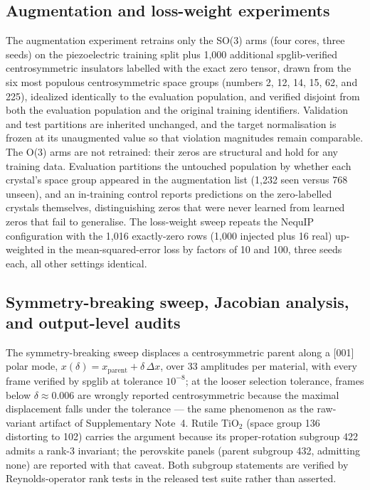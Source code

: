\subsection*{Augmentation and loss-weight experiments}

The augmentation experiment retrains only the SO(3) arms (four cores, three seeds) on the piezoelectric training split plus 1,000 additional spglib-verified centrosymmetric insulators labelled with the exact zero tensor, drawn from the six most populous centrosymmetric space groups (numbers 2, 12, 14, 15, 62, and 225), idealized identically to the evaluation population, and verified disjoint from both the evaluation population and the original training identifiers. Validation and test partitions are inherited unchanged, and the target normalisation is frozen at its unaugmented value so that violation magnitudes remain comparable. The O(3) arms are not retrained: their zeros are structural and hold for any training data. Evaluation partitions the untouched population by whether each crystal's space group appeared in the augmentation list (1,232 seen versus 768 unseen), and an in-training control reports predictions on the zero-labelled crystals themselves, distinguishing zeros that were never learned from learned zeros that fail to generalise. The loss-weight sweep repeats the NequIP configuration with the 1,016 exactly-zero rows (1,000 injected plus 16 real) up-weighted in the mean-squared-error loss by factors of 10 and 100, three seeds each, all other settings identical.

\subsection*{Symmetry-breaking sweep, Jacobian analysis, and output-level audits}

The symmetry-breaking sweep displaces a centrosymmetric parent along a [001] polar mode, $x(\delta) = x_{\mathrm{parent}} + \delta\,\Delta x$, over 33 amplitudes per material, with every frame verified by spglib at tolerance $10^{-8}$; at the looser selection tolerance, frames below $\delta\approx0.006$ are wrongly reported centrosymmetric because the maximal displacement falls under the tolerance --- the same phenomenon as the raw-variant artifact of Supplementary Note~4. Rutile TiO$_2$ (space group 136 distorting to 102) carries the argument because its proper-rotation subgroup 422 admits a rank-3 invariant; the perovskite panels (parent subgroup 432, admitting none) are reported with that caveat. Both subgroup statements are verified by Reynolds-operator rank tests in the released test suite rather than asserted.

